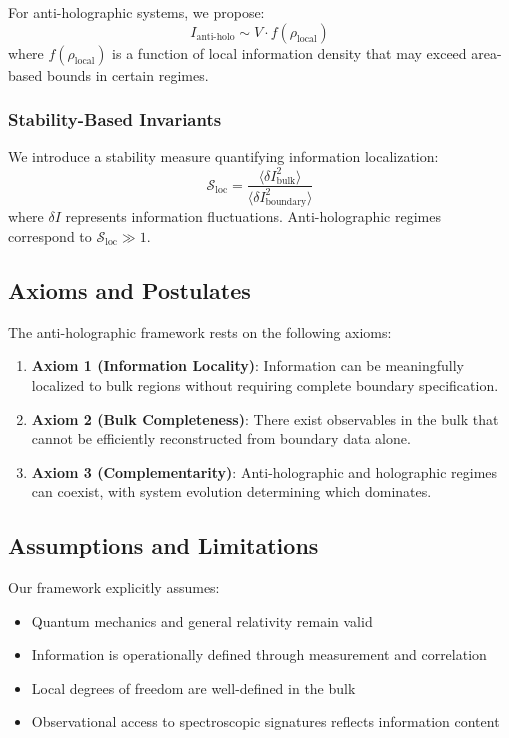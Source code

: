 \documentclass[twocolumn,aps,prd,superscriptaddress,nofootinbib]{revtex4-2}
\begin{document}
For anti-holographic systems, we propose:
\begin{equation}
I_{\text{anti-holo}} \sim V \cdot f(\rho_{\text{local}})
\label{eq:anti_holo_scaling}
\end{equation}
where $f(\rho_{\text{local}})$ is a function of local information density that may exceed area-based bounds in certain regimes.

\subsubsection{Stability-Based Invariants}

We introduce a stability measure quantifying information localization:
\begin{equation}
\mathcal{S}_{\text{loc}} = \frac{\langle \delta I_{\text{bulk}}^2 \rangle}{\langle \delta I_{\text{boundary}}^2 \rangle}
\end{equation}
where $\delta I$ represents information fluctuations. Anti-holographic regimes correspond to $\mathcal{S}_{\text{loc}} \gg 1$.

\subsection{Axioms and Postulates}

The anti-holographic framework rests on the following axioms:

\begin{enumerate}
    \item \textbf{Axiom 1 (Information Locality)}: Information can be meaningfully localized to bulk regions without requiring complete boundary specification.
    
    \item \textbf{Axiom 2 (Bulk Completeness)}: There exist observables in the bulk that cannot be efficiently reconstructed from boundary data alone.
    
    \item \textbf{Axiom 3 (Complementarity)}: Anti-holographic and holographic regimes can coexist, with system evolution determining which dominates.
\end{enumerate}

\subsection{Assumptions and Limitations}

Our framework explicitly assumes:
\begin{itemize}
    \item Quantum mechanics and general relativity remain valid
    \item Information is operationally defined through measurement and correlation
    \item Local degrees of freedom are well-defined in the bulk
    \item Observational access to spectroscopic signatures reflects information content
\end{itemize}
\end{document}
